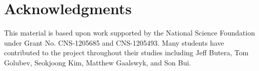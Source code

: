 \section{Acknowledgments}
\label{sec:acknowledgements}
This material is based upon work supported by the National Science
Foundation under Grant No. CNS-1205685 and CNS-1205493. Many students
have contributed to the project throughout their studies including
Jeff Butera, Tom Golubev, Seokjoong Kim, Matthew Gaalswyk, and Son
Bui.
